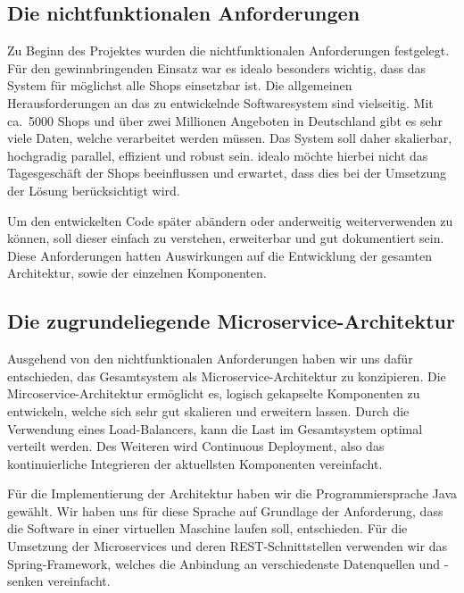 \subsection{Die nichtfunktionalen Anforderungen}
\label{subsec:nichtfunktionale-anforderungen}

Zu Beginn des Projektes wurden die nichtfunktionalen Anforderungen festgelegt.
Für den gewinnbringenden Einsatz war es idealo besonders wichtig, dass das System für möglichst alle Shops einsetzbar
ist.
Die allgemeinen Herausforderungen an das zu entwickelnde Softwaresystem sind vielseitig.
Mit ca.\ 5000 Shops und über zwei Millionen Angeboten in Deutschland gibt es sehr viele Daten, welche verarbeitet
werden müssen.
Das System soll daher skalierbar, hochgradig parallel, effizient und robust sein.
idealo möchte hierbei nicht das Tagesgeschäft der Shops beeinflussen und erwartet, dass dies bei der Umsetzung der
Lösung berücksichtigt wird.

Um den entwickelten Code später abändern oder anderweitig weiterverwenden zu können, soll dieser einfach zu
verstehen, erweiterbar und gut dokumentiert sein.
Diese Anforderungen hatten Auswirkungen auf die Entwicklung der gesamten Architektur, sowie der einzelnen Komponenten.

\subsection{Die zugrundeliegende Microservice-Architektur}
\label{subsec:microservice-architektur}

Ausgehend von den nichtfunktionalen Anforderungen haben wir uns dafür entschieden, das Gesamtsystem als
Microservice-Architektur zu konzipieren.
Die Mircoservice-Architektur ermöglicht es, logisch gekapselte Komponenten zu entwickeln, welche sich sehr gut
skalieren und erweitern lassen.
Durch die Verwendung eines Load-Balancers, kann die Last im Gesamtsystem optimal verteilt werden.
Des Weiteren wird Continuous Deployment, also das kontinuierliche Integrieren der aktuellsten Komponenten vereinfacht.

Für die Implementierung der Architektur haben wir die Programmiersprache Java gewählt.
Wir haben uns für diese Sprache auf Grundlage der Anforderung, dass die Software in einer virtuellen Maschine laufen
soll, entschieden.
Für die Umsetzung der Microservices und deren REST-Schnittstellen verwenden wir das Spring-Framework, welches die
Anbindung an verschiedenste Datenquellen und -senken vereinfacht.

